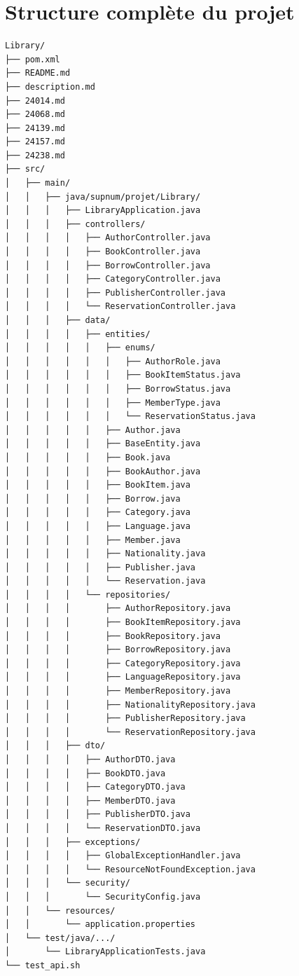 \documentclass[12pt,a4paper,twoside]{report}
\begin{document}
\section{Structure complète du projet}

\begin{lstlisting}[caption=Arborescence complète du projet]
Library/
├── pom.xml
├── README.md
├── description.md
├── 24014.md
├── 24068.md
├── 24139.md
├── 24157.md
├── 24238.md
├── src/
│   ├── main/
│   │   ├── java/supnum/projet/Library/
│   │   │   ├── LibraryApplication.java
│   │   │   ├── controllers/
│   │   │   │   ├── AuthorController.java
│   │   │   │   ├── BookController.java
│   │   │   │   ├── BorrowController.java
│   │   │   │   ├── CategoryController.java
│   │   │   │   ├── PublisherController.java
│   │   │   │   └── ReservationController.java
│   │   │   ├── data/
│   │   │   │   ├── entities/
│   │   │   │   │   ├── enums/
│   │   │   │   │   │   ├── AuthorRole.java
│   │   │   │   │   │   ├── BookItemStatus.java
│   │   │   │   │   │   ├── BorrowStatus.java
│   │   │   │   │   │   ├── MemberType.java
│   │   │   │   │   │   └── ReservationStatus.java
│   │   │   │   │   ├── Author.java
│   │   │   │   │   ├── BaseEntity.java
│   │   │   │   │   ├── Book.java
│   │   │   │   │   ├── BookAuthor.java
│   │   │   │   │   ├── BookItem.java
│   │   │   │   │   ├── Borrow.java
│   │   │   │   │   ├── Category.java
│   │   │   │   │   ├── Language.java
│   │   │   │   │   ├── Member.java
│   │   │   │   │   ├── Nationality.java
│   │   │   │   │   ├── Publisher.java
│   │   │   │   │   └── Reservation.java
│   │   │   │   └── repositories/
│   │   │   │       ├── AuthorRepository.java
│   │   │   │       ├── BookItemRepository.java
│   │   │   │       ├── BookRepository.java
│   │   │   │       ├── BorrowRepository.java
│   │   │   │       ├── CategoryRepository.java
│   │   │   │       ├── LanguageRepository.java
│   │   │   │       ├── MemberRepository.java
│   │   │   │       ├── NationalityRepository.java
│   │   │   │       ├── PublisherRepository.java
│   │   │   │       └── ReservationRepository.java
│   │   │   ├── dto/
│   │   │   │   ├── AuthorDTO.java
│   │   │   │   ├── BookDTO.java
│   │   │   │   ├── CategoryDTO.java
│   │   │   │   ├── MemberDTO.java
│   │   │   │   ├── PublisherDTO.java
│   │   │   │   └── ReservationDTO.java
│   │   │   ├── exceptions/
│   │   │   │   ├── GlobalExceptionHandler.java
│   │   │   │   └── ResourceNotFoundException.java
│   │   │   └── security/
│   │   │       └── SecurityConfig.java
│   │   └── resources/
│   │       └── application.properties
│   └── test/java/.../
│       └── LibraryApplicationTests.java
└── test_api.sh
\end{lstlisting}
\end{document}
